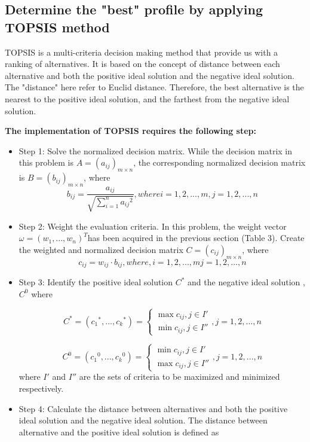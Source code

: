 \subsection{Determine the "best" profile by applying TOPSIS method}
	TOPSIS is a multi-criteria decision making method that provide us with a ranking of alternatives. It is based on the concept of distance between each alternative and both the positive ideal solution and the negative ideal solution. The "distance" here refer to Euclid distance. Therefore, the best alternative is the nearest to the positive ideal solution, and the farthest from the negative ideal solution. 
 
 
 \textbf{The implementation of TOPSIS requires the following step:}
\begin{itemize} 
 \item Step 1: Solve the normalized decision matrix. While the decision matrix in this problem is  $A = {({a_{ij}})_{m \times n}}$, the corresponding normalized decision matrix is $B = {({b_{ij}})_{m \times n}}$, where
	 $${b_{ij}} = \frac{{{a_{ij}}}}{{\sqrt {\sum\limits_{i = 1}^n {{a_{ij}}^2} } }} , where i = 1,2,...,m, j = 1,2,...,n$$


\item Step 2: Weight the evaluation criteria. In this problem, the weight vector $\omega  = {({w_1},...,{w_n})^T}$has been acquired in the previous section (Table 3). Create the weighted and normalized decision matrix  $C= {({c_{ij}})_{m \times n}}$, where
	 $${c_{ij}} = {w_{ij}} \cdot {b_{ij}} , where ,i = 1,2,...,m j = 1,2,...,n$$


\item Step 3: Identify the positive ideal solution  ${C^*}$ and the negative ideal solution  ,${C^0}$ where
	
 
$${C^*} = ({c_1}^*,...,{c_k}^*) = \left\{ {\begin{array}{*{20}{c}}
{\max {c_{ij}},j \in I'}\\
{\min {c_{ij}},j \in I''}
\end{array}} \right. ,   j = 1,2,...,n$$
	  
$${C^0} = ({c_1}^0,...,{c_k}^0) = \left\{ {\begin{array}{*{20}{c}}
{\min {c_{ij}},j \in I'}\\
{\max {c_{ij}},j \in I''}
\end{array}} \right.,  j = 1,2,...,n$$
   where  $I'$ and  $I''$ are the sets of criteria to be maximized and minimized respectively.

\item Step 4: Calculate the distance between alternatives and both the positive ideal solution and the negative ideal solution. The distance between alternative   and the positive ideal solution is defined as
	  

\end{itemize}
